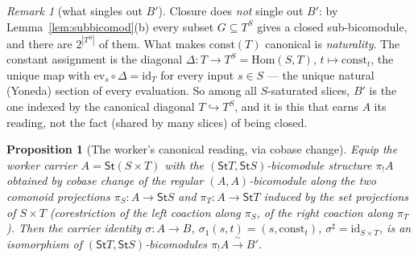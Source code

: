\documentclass[11pt]{article}
\newcommand{\St}{\mathsf{St}}                      %
\newcommand{\Hom}{\mathrm{Hom}}
\newcommand{\bk}[1]{{#1}^{\sharp}}                 %
\newcommand{\const}{\mathrm{const}}
\theoremstyle{plain}
\newtheorem{proposition}{Proposition}
\theoremstyle{definition}
\theoremstyle{remark}
\newtheorem{remark}{Remark}
\begin{document}
\begin{remark}[what singles out $B'$]\label{rem:yoneda}
Closure does \emph{not} single out $B'$: by Lemma~\ref{lem:subbicomod}(b) every subset
$G\subseteq T^S$ gives a closed sub-bicomodule, and there are $2^{|T^S|}$ of them. What makes
$\const(T)$ canonical is \emph{naturality}. The constant assignment is the diagonal
$\Delta\colon T\to T^S=\Hom(S,T)$, $t\mapsto\const_t$, the unique map with
$\mathrm{ev}_s\circ\Delta=\mathrm{id}_T$ for every input $s\in S$ --- the unique natural
(Yoneda) section of every evaluation. So among all $S$-saturated slices, $B'$ is the one
indexed by the canonical diagonal $T\hookrightarrow T^S$, and it is this that earns $A$ its
reading, not the fact (shared by many slices) of being closed.
\end{remark}

\begin{proposition}[The worker's canonical reading, via cobase change]\label{prop:sigma}
Equip the worker carrier $A=\St(S\times T)$ with the $(\St T,\St S)$-bicomodule structure
$\pi_!A$ obtained by \emph{cobase change} of the regular $(A,A)$-bicomodule along the two
comonoid projections $\pi_S\colon A\to\St S$ and $\pi_T\colon A\to\St T$ induced by the set
projections of $S\times T$ \textup{(}corestriction of the left coaction along $\pi_S$, of
the right coaction along $\pi_T$\textup{)}. Then the carrier identity
$\sigma\colon A\to B$, $\sigma_1(s,t)=(s,\const_t)$, $\bk\sigma=\mathrm{id}_{S\times T}$, is
an isomorphism of $(\St T,\St S)$-bicomodules $\pi_!A\xrightarrow{\ \sim\ }B'$.
\end{proposition}
\end{document}
